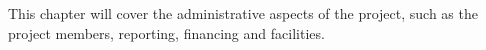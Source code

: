 This chapter will cover the administrative aspects of the project, such as the project members, reporting, financing and facilities.
